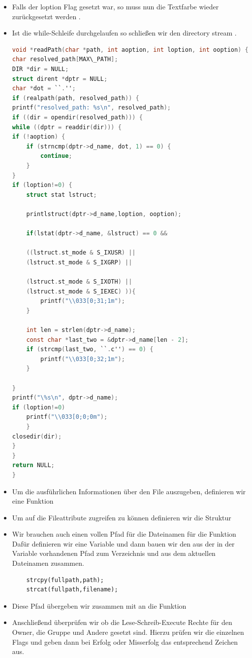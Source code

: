 \begin{itemize}
\item Falls der loption Flag gesetzt war, so muss nun die Textfarbe wieder
zurückgesetzt werden \command{if (loption!=0) printf("\033[0;0;0m");}.

\item Ist die while-Schleife durchgelaufen so schließen wir den directory
stream .


\begin{lstlisting}[language=C]
void *readPath(char *path, int aoption, int loption, int ooption) {
char resolved_path[MAX\_PATH];
DIR *dir = NULL;
struct dirent *dptr = NULL;
char *dot = ``.'';
if (realpath(path, resolved_path)) {
printf("resolved_path: %s\n", resolved_path);
if ((dir = opendir(resolved_path))) {
while ((dptr = readdir(dir))) {
if (!aoption) {
	if (strncmp(dptr->d_name, dot, 1) == 0) {
		continue;
	}
}
if (loption!=0) {
	struct stat lstruct;

	printlstruct(dptr->d_name,loption, ooption);

	if(lstat(dptr->d_name, &lstruct) == 0 &&

	((lstruct.st_mode & S_IXUSR) ||
	(lstruct.st_mode & S_IXGRP) ||

	(lstruct.st_mode & S_IXOTH) ||
	(lstruct.st_mode & S_IEXEC) )){
		printf("\\033[0;31;1m");
	}

	int len = strlen(dptr->d_name);
	const char *last_two = &dptr->d_name[len - 2];
	if (strcmp(last_two, ``.c'') == 0) {
		printf("\\033[0;32;1m");
	}

}
printf("\%s\n", dptr->d_name);
if (loption!=0)
	printf("\\033[0;0;0m");
	}
closedir(dir);
}
}
return NULL;
}
\end{lstlisting}
\item Um die ausführlichen Informationen über den File auszugeben, definieren wir eine Funktion
\newline
{}
\newline
\item Um auf die Fileattribute zugreifen zu können definieren wir die Struktur
\newline {}
\item Wir brauchen auch einen vollen Pfad für die Dateinamen für die Funktion 
Dafür definieren wir eine Variable  und dann
bauen wir den aus der in der Variable  vorhandenen Pfad zum Verzeichnis
und aus dem aktuellen Dateinamen zusammen.
\begin{lstlisting}
	strcpy(fullpath,path);
	strcat(fullpath,filename);
\end{lstlisting}
\item Diese Pfad übergeben wir zusammen mit  an die Funktion
\item Anschließend überprüfen wir ob die Lese-Schreib-Execute Rechte für den
Owner, die Gruppe und Andere gesetzt sind. Hierzu prüfen wir die einzelnen
Flags und geben dann bei Erfolg oder Misserfolg das entsprechend Zeichen aus.


\end{itemize}
